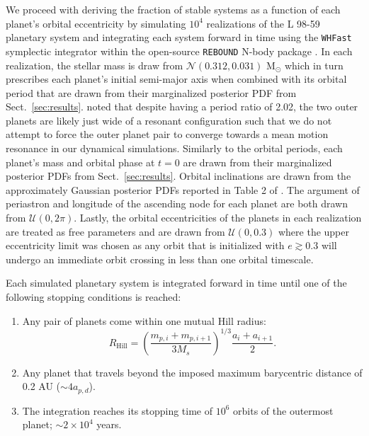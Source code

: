 \documentclass[longauth]{aa}
\begin{document}
We proceed with deriving the fraction of stable systems as a function of each planet's orbital eccentricity by simulating $10^4$ realizations of the L 98-59 planetary system and integrating each system forward in time using the \texttt{WHFast} symplectic integrator \citep{rein15} within the open-source \texttt{REBOUND} N-body package \citep{rein12}. In each realization, the stellar mass is draw from $\mathcal{N}(0.312,0.031)$ M$_{\odot}$ which in turn prescribes each planet's initial semi-major axis when combined with its orbital period that are drawn from their marginalized posterior PDF from Sect.~\ref{sec:results}.  noted that despite having a period ratio of 2.02, the two outer planets are likely just wide of a resonant configuration such that we do not attempt to force the outer planet pair to converge towards a mean motion resonance in our dynamical simulations. Similarly to the orbital periods, each planet's mass and orbital phase at $t=0$ are drawn from their marginalized posterior PDFs from Sect.~\ref{sec:results}. Orbital inclinations are drawn from the approximately Gaussian posterior PDFs reported in Table 2 of . The argument of periastron and longitude of the ascending node for each planet are both drawn from $\mathcal{U}(0,2\pi)$. Lastly, the orbital eccentricities of the planets in each realization are treated as free parameters and are drawn from $\mathcal{U}(0,0.3)$ where the upper eccentricity limit was chosen as any orbit that is initialized with $e\gtrsim 0.3$ will undergo an immediate orbit crossing in less than one orbital timescale. 

Each simulated planetary system is integrated forward in time until one of the following stopping conditions is reached:

\begin{enumerate}
    \item Any pair of planets come within one mutual Hill radius:
    \begin{equation}
        R_{\text{Hill}} = \left( \frac{m_{p,i}+m_{p,i+1}}{3M_s} \right)^{1/3} \frac{a_i+a_{i+1}}{2}.
    \end{equation} 
    \item Any planet that travels beyond the imposed maximum barycentric distance of 0.2 AU ($\sim 4 a_{p,d}$). 
    \item The integration reaches its stopping time of $10^6$ orbits of the outermost planet; $\sim 2\times 10^4$ years. 
\end{enumerate}
\end{document}
